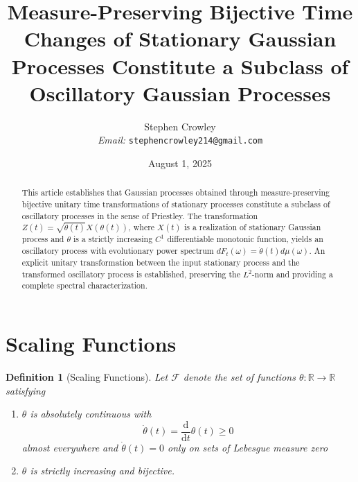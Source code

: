 \documentclass{article}
\newcommand{\mathd}{\mathrm{d}}
\newcommand{\tmemail}[1]{\\ \textit{Email:} \texttt{#1}}
\newtheorem{definition}{Definition}
\begin{document}
\title{Measure-Preserving Bijective Time Changes of Stationary Gaussian
Processes Constitute a Subclass of Oscillatory Gaussian Processes}

\author{
  Stephen Crowley
  \tmemail{stephencrowley214@gmail.com}
}

\date{August 1, 2025}

\maketitle

\begin{abstract}
  This article establishes that Gaussian processes obtained through
  measure-preserving bijective unitary time transformations of stationary
  processes constitute a subclass of oscillatory processes in the sense of
  Priestley. The transformation $Z (t) = \sqrt{\dot{\theta} (t)} X (\theta
  (t))$, where $X (t)$ is a realization of stationary Gaussian process and
  $\theta$ is a strictly increasing $C^1$ differentiable monotonic function,
  yields an oscillatory process with evolutionary power spectrum $dF_t
  (\omega) = \dot{\theta} (t) d \mu (\omega)$. An explicit unitary
  transformation between the input stationary process and the transformed
  oscillatory process is established, preserving the $L^2$-norm and providing
  a complete spectral characterization.
\end{abstract}

{\tableofcontents}

\section{Scaling Functions}\label{sec:scaling}

\begin{definition}
  [Scaling Functions]\label{def:scaling} Let $\mathcal{F}$ denote the set of
  functions $\theta : \mathbb{R} \to \mathbb{R}$ satisfying
  \begin{enumerate}
    \item $\theta$ is absolutely continuous with
    \begin{equation}
      \dot{\theta} (t) = \frac{\mathd}{\mathd t} \theta (t) \geq 0
    \end{equation}
    almost everywhere and $\dot{\theta} (t) = 0$ only on sets of Lebesgue
    measure zero
    
    \item $\theta$ is strictly increasing and bijective.
  \end{enumerate}
\end{definition}
\end{document}
